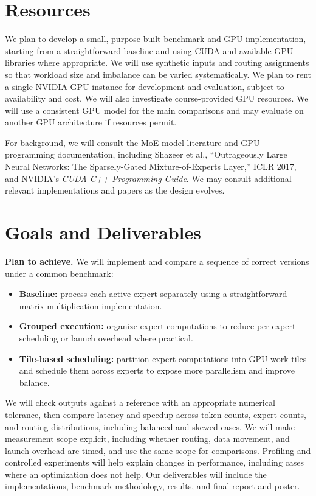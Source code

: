 \documentclass[11pt]{article}
\begin{document}
\section*{Resources}
We plan to develop a small, purpose-built benchmark and GPU implementation, starting from a straightforward baseline and using CUDA and available GPU libraries where appropriate. We will use synthetic inputs and routing assignments so that workload size and imbalance can be varied systematically. We plan to rent a single NVIDIA GPU instance for development and evaluation, subject to availability and cost. We will also investigate course-provided GPU resources. We will use a consistent GPU model for the main comparisons and may evaluate on another GPU architecture if resources permit.

For background, we will consult the MoE model literature and GPU programming documentation, including Shazeer et al., ``Outrageously Large Neural Networks: The Sparsely-Gated Mixture-of-Experts Layer,'' ICLR 2017, and NVIDIA's \emph{CUDA C++ Programming Guide}. We may consult additional relevant implementations and papers as the design evolves.
\section*{Goals and Deliverables}
\textbf{Plan to achieve.} We will implement and compare a sequence of correct versions under a common benchmark:
\begin{itemize}
\item \textbf{Baseline:} process each active expert separately using a straightforward matrix-multiplication implementation.
\item \textbf{Grouped execution:} organize expert computations to reduce per-expert scheduling or launch overhead where practical.
\item \textbf{Tile-based scheduling:} partition expert computations into GPU work tiles and schedule them across experts to expose more parallelism and improve balance.
\end{itemize}
We will check outputs against a reference with an appropriate numerical tolerance, then compare latency and speedup across token counts, expert counts, and routing distributions, including balanced and skewed cases. We will make measurement scope explicit, including whether routing, data movement, and launch overhead are timed, and use the same scope for comparisons. Profiling and controlled experiments will help explain changes in performance, including cases where an optimization does not help. Our deliverables will include the implementations, benchmark methodology, results, and final report and poster.
\end{document}
